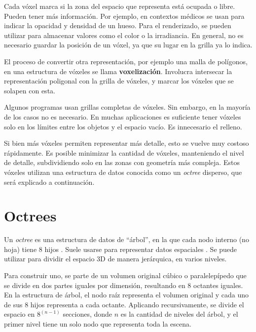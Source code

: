 

Cada vóxel marca si la zona del espacio que representa está ocupada o libre.
Pueden tener más información.
Por ejemplo, en contextos médicos se usan para indicar la opacidad y densidad de un hueso.
Para el renderizado, se pueden utilizar para almacenar valores como el color o la irradiancia.
En general, no es necesario guardar la posición de un vóxel, ya que su lugar en la grilla ya lo indica.

El proceso de convertir otra representación, por ejemplo una malla de polígonos, en una estructura de vóxeles se llama \textbf{voxelización}.
Involucra intersecar la representación poligonal con la grilla de vóxeles, y marcar los vóxeles que se solapen con esta.

Algunos programas usan grillas completas de vóxeles.
Sin embargo, en la mayoría de los casos no es necesario.
En muchas aplicaciones es suficiente tener vóxeles solo en los límites entre los objetos y el espacio vacío.
Es innecesario el relleno.

Si bien más vóxeles permiten representar más detalle, esto se vuelve muy costoso rápidamente.
Es posible minimizar la cantidad de vóxeles, manteniendo el nivel de detalle, subdividiendo solo en las zonas con geometría más compleja.
Estos vóxeles utilizan una estructura de datos conocida como un \textit{octree} disperso, que será explicado a continuación.

\section{Octrees}\label{sec:octree}

Un \textit{octree} es una estructura de datos de ``árbol'', en la que cada nodo interno (no hoja) tiene $8$ hijos \cite{rtr}.
Suele usarse para representar datos espaciales \cite{octree-textures}.
Se puede utilizar para dividir el espacio 3D de manera jerárquica, en varios niveles.

Para construir uno, se parte de un volumen original cúbico o paralelepípedo que se divide en dos partes iguales por dimensión, resultando en $8$ octantes iguales.
En la estructura de árbol, el nodo raíz representa el volumen original y cada uno de sus $8$ hijos representa a cada octante.
Aplicando recursivamente, se divide el espacio en $8^{(n - 1)}$ secciones, donde $n$ es la cantidad de niveles del árbol, y el primer nivel tiene un solo nodo que representa toda la escena.

